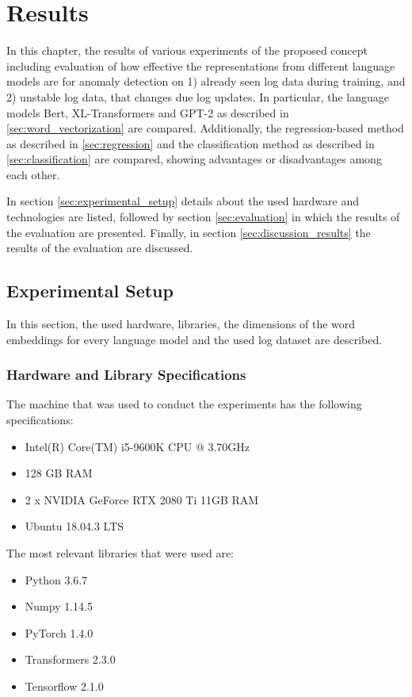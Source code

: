 \chapter{Results\label{cha:results}}
In this chapter, the results of various experiments of the proposed concept including evaluation of how effective the representations from different language models are for anomaly detection on 1) already seen log data during training, and 2) unstable log data, that changes due log updates. In particular, the language models Bert, XL-Transformers and GPT-2 as described in \ref{sec:word_vectorization} are compared. Additionally, the regression-based method as described in \ref{sec:regression} and the classification method as described in \ref{sec:classification} are compared, showing advantages or disadvantages among each other.

In section \ref{sec:experimental_setup} details about the used hardware and technologies are listed, followed by section \ref{sec:evaluation} in which the results of the evaluation are presented. Finally, in section \ref{sec:discussion_results} the results of the evaluation are discussed.


\section{Experimental Setup\label{sec:experimental_setup}}
In this section, the used hardware, libraries, the dimensions of the word embeddings for every language model and the used log dataset are described.

\subsection{Hardware and Library Specifications}
The machine that was used to conduct the experiments has the following specifications:
\begin{itemize}
	\item Intel(R) Core(TM) i5-9600K CPU @ 3.70GHz
	\item 128 GB RAM
	\item 2 x NVIDIA GeForce RTX 2080 Ti 11GB RAM
	\item Ubuntu 18.04.3 LTS
\end{itemize}

\noindent The most relevant libraries that were used are:
\begin{itemize}
	\item Python 3.6.7
	\item Numpy 1.14.5
	\item PyTorch 1.4.0
	\item Transformers 2.3.0
	\item Tensorflow 2.1.0
\end{itemize}

